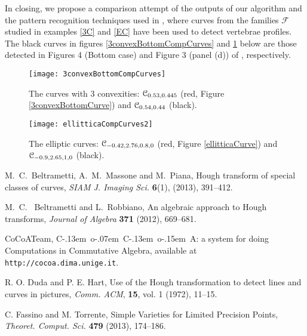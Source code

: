 \documentclass[10pt]{article}
\newcommand\sC{{\cal C}}
\def\cocoa{{\hbox{\rm C\kern-.13em o\kern-.07em C\kern-.13em o\kern-.15em A}}}
\begin{document}
{In closing,  we propose a comparison attempt of  the outputs of our algorithm   and  the  pattern recognition techniques used in  \cite{etal},  where curves from the families $\mathcal F$ studied in examples \ref{3C} and \ref{EC} have been used  to detect vertebrae profiles. The black curves in figures \ref{3convexBottomCompCurves} and \ref{ellitticCompCurves} below  are those detected  in Figures 4 (Bottom case) and Figure 3 (panel  (d))  of \cite{etal}, respectively.


\begin{figure}[htb]
\centering
\begin{minipage}[c]{0.4\textwidth}
\texttt{[image: 3convexBottomCompCurves]}
\caption{\small{The curves with $3$ convexities: $\sC_{0.53,0.445}$ (red,  Figure \ref{3convexBottomCurve}) and $\sC_{0.54, 0.44}$ (black).}}\label{3convexBottomCompCurves}
\end{minipage}%
\hspace{0.29cm}
\begin{minipage}[c]{0.47\textwidth}
\texttt{[image: ellitticaCompCurves2]}
\caption{\small{The elliptic curves: $\sC_{-0.42, 2.76, 0.8, 0}$ (red, Figure \ref{ellitticaCurve}) and $\sC_{-0.9, 2.65, 1, 0}$ (black).}}\label{ellitticCompCurves}
\end{minipage}
\end{figure}




\small{


\begin{thebibliography}{10}


 M.~C.~Beltrametti, A.~M.~Massone and M.~Piana, Hough transform of special classes of curves, {\em SIAM J. Imaging Sci.} {\bf 6}(1), (2013), 391--412.

 M.~C.~ Beltrametti and L.~Robbiano,  An algebraic approach to Hough transforms, {\em Journal of Algebra} {\bf 371} (2012), 669--681.


 CoCoATeam, \cocoa: a system for doing {C}omputations in {C}ommutative {A}lgebra,
   available at \/ {\tt http://cocoa.dima.unige.it}.
   
  R. O. Duda and P. E. Hart, Use of the Hough transformation to detect lines and curves in pictures,
 {\em Comm. ACM}, {\bf 15}, vol. 1 (1972), 11--15.
 
  C. Fassino and M. Torrente, Simple Varieties for Limited Precision Points, 
{\em Theoret. Comput. Sci.} {\bf 479} (2013), 174--186.
  

\end{thebibliography}}}
\end{document}
